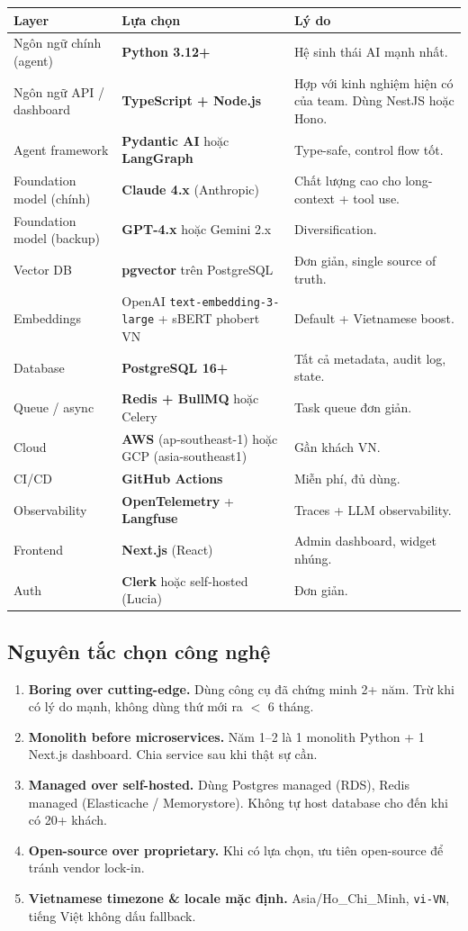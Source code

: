 \documentclass[11pt,a4paper]{article}
\begin{document}
\begin{tabularx}{\linewidth}{@{}p{3.5cm} p{4cm} X@{}}
\toprule
\textbf{Layer} & \textbf{Lựa chọn} & \textbf{Lý do} \\
\midrule
Ngôn ngữ chính (agent) & \textbf{Python 3.12+} & Hệ sinh thái AI mạnh nhất. \\
Ngôn ngữ API / dashboard & \textbf{TypeScript + Node.js} & Hợp với kinh nghiệm hiện có của team. Dùng NestJS hoặc Hono. \\
Agent framework & \textbf{Pydantic AI} hoặc \textbf{LangGraph} & Type-safe, control flow tốt. \\
Foundation model (chính) & \textbf{Claude 4.x} (Anthropic) & Chất lượng cao cho long-context + tool use. \\
Foundation model (backup) & \textbf{GPT-4.x} hoặc Gemini 2.x & Diversification. \\
Vector DB & \textbf{pgvector} trên PostgreSQL & Đơn giản, single source of truth. \\
Embeddings & OpenAI \texttt{text-embedding-3-large} + sBERT phobert VN & Default + Vietnamese boost. \\
Database & \textbf{PostgreSQL 16+} & Tất cả metadata, audit log, state. \\
Queue / async & \textbf{Redis + BullMQ} hoặc Celery & Task queue đơn giản. \\
Cloud & \textbf{AWS} (ap-southeast-1) hoặc GCP (asia-southeast1) & Gần khách VN. \\
CI/CD & \textbf{GitHub Actions} & Miễn phí, đủ dùng. \\
Observability & \textbf{OpenTelemetry} + \textbf{Langfuse} & Traces + LLM observability. \\
Frontend & \textbf{Next.js} (React) & Admin dashboard, widget nhúng. \\
Auth & \textbf{Clerk} hoặc self-hosted (Lucia) & Đơn giản. \\
\bottomrule
\end{tabularx}

\subsection{Nguyên tắc chọn công nghệ}

\begin{enumerate}
\item \textbf{Boring over cutting-edge.} Dùng công cụ đã chứng minh 2+ năm. Trừ khi có lý do mạnh, không dùng thứ mới ra $<$ 6 tháng.
\item \textbf{Monolith before microservices.} Năm 1--2 là 1 monolith Python + 1 Next.js dashboard. Chia service sau khi thật sự cần.
\item \textbf{Managed over self-hosted.} Dùng Postgres managed (RDS), Redis managed (Elasticache / Memorystore). Không tự host database cho đến khi có 20+ khách.
\item \textbf{Open-source over proprietary.} Khi có lựa chọn, ưu tiên open-source để tránh vendor lock-in.
\item \textbf{Vietnamese timezone \& locale mặc định.} Asia/Ho\_Chi\_Minh, \texttt{vi-VN}, tiếng Việt không dấu fallback.
\end{enumerate}
\end{document}
